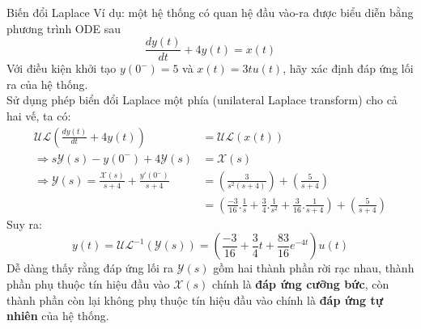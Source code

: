 \documentclass[8pt]{beamer}
\begin{document}
\begin{frame}{Biến đổi Laplace}
Ví dụ: một hệ thống có quan hệ đầu vào-ra được biểu diễn bằng phương trình ODE sau
$$\frac{dy(t)}{dt}+4y(t)=x(t)$$
Với điều kiện khởi tạo $y(0^-)=5$ và $x(t)=3tu(t)$, hãy xác định đáp ứng lối ra của hệ thống.
\\ Sử dụng phép biển đổi Laplace một phía (unilateral Laplace transform) cho cả hai vế, ta có:
\begin{equation*}
\begin{split}
	\mathscr{UL}\left(\frac{dy(t)}{dt}+4y(t)\right)&=\mathscr{UL}(x(t))\\
	\Rightarrow s\mathscr{Y}(s)-y(0^-)+4\mathscr{Y}(s)&=\mathscr{X}(s)\\
	\Rightarrow \mathscr{Y}(s)=\frac{\mathscr{X}(s)}{s+4}+\frac{y'(0^-)}{s+4}&=\left(\frac{3}{s^2(s+4)}\right)+\left(\frac{5}{s+4}\right)\\
&= \left(\frac{-3}{16}.\frac{1}{s}+\frac{3}{4}.\frac{1}{s^2}+\frac{3}{16}.\frac{1}{s+4}\right)+\left(\frac{5}{s+4}\right)
\end{split}
\end{equation*}
Suy ra:
$$y(t)=\mathscr{UL}^{-1}(\mathscr{Y}(s))=\left(\frac{-3}{16}+\frac{3}{4}t+\frac{83}{16}e^{-4t}\right)u(t)$$
  Dễ dàng thấy rằng đáp ứng lối ra $\mathscr{Y}(s)$ gồm hai thành phần rời rạc nhau, thành phần phụ thuộc tín hiệu đầu vào $\mathscr{X}(s)$ chính là \alert{\textbf{đáp ứng cưỡng bức}}, còn thành phần còn lại không phụ thuộc tín hiệu đầu vào chính là \alert{\textbf{đáp ứng tự nhiên}} của hệ thống.
\end{frame}
\end{document}
